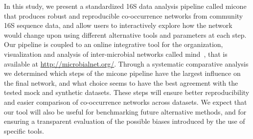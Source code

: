  In this study, we present a standardized 16S data analysis pipeline called \ac{micone} that produces robust and reproducible co-occurrence networks from community 16S sequence data, and allow users to interactively explore how the network would change upon using different alternative tools and parameters at each step.
 Our pipeline is coupled to an online integrative tool for the organization, visualization and analysis of inter-microbial networks called \ac{mind}~\cite{huResourceComparisonIntegration2022}, that is available at \href{http://microbialnet.org/}{http://microbialnet.org/}.
Through a systematic comparative analysis we determined which steps of the \ac{micone} pipeline have the largest influence on the final network, and what choice seems to have the best agreement with the tested mock and synthetic datasets.
These steps will ensure better reproducibility and easier comparison of co-occurrence networks across datasets.
We expect that our tool will also be useful for benchmarking future alternative methods, and for ensuring a transparent evaluation of the possible biases introduced by the use of specific tools.
